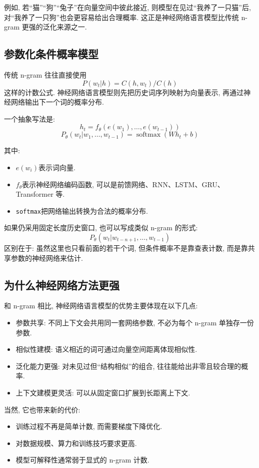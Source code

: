 例如, 若“猫”“狗”“兔子”在向量空间中彼此接近,
则模型在见过“我养了一只猫”后, 对“我养了一只狗”也会更容易给出合理概率.
这正是神经网络语言模型比传统 n-gram 更强的泛化来源之一.

\subsection{参数化条件概率模型}


传统 n-gram 往往直接使用
\[
P(w_t | h) = C(h, w_t) / C(h)
\]
这样的计数公式.
神经网络语言模型则先把历史词序列映射为向量表示, 再通过神经网络输出下一个词的概率分布.

一个抽象写法是:
\[
h_t = f_{\theta} (e(w_1), \dots, e(w_{t-1}))
\]
\[
P_{\theta} (w_t | w_1, \dots, w_{t-1})
  = \operatorname{softmax}(W h_t + b)
\]

其中:

\begin{itemize}
\item $e(w_i)$表示词向量.
\item $f_{\theta}$表示神经网络编码函数, 可以是前馈网络、RNN、LSTM、GRU、Transformer 等.
\item \texttt{softmax}把网络输出转换为合法的概率分布.
\end{itemize}

如果仍采用固定长度历史窗口, 也可以写成类似 n-gram 的形式:
\[
P_{\theta} (w_t | w_{t-n+1}, \dots, w_{t-1})
\]
区别在于:
虽然这里也只看前面的若干个词, 但条件概率不是靠查表计数,
而是靠共享参数的神经网络来估计.

\subsection{为什么神经网络方法更强}


和 n-gram 相比, 神经网络语言模型的优势主要体现在以下几点:

\begin{itemize}
\item 参数共享: 不同上下文会共用同一套网络参数, 不必为每个 n-gram 单独存一份参数.
\item 相似性建模: 语义相近的词可通过向量空间距离体现相似性.
\item 泛化能力更强: 对未见过但“结构相似”的组合, 往往能给出非零且较合理的概率.
\item 上下文建模更灵活: 可以从固定窗口扩展到长距离上下文.
\end{itemize}

当然, 它也带来新的代价:

\begin{itemize}
\item 训练过程不再是简单计数, 而需要梯度下降优化.
\item 对数据规模、算力和训练技巧要求更高.
\item 模型可解释性通常弱于显式的 n-gram 计数.
\end{itemize}

